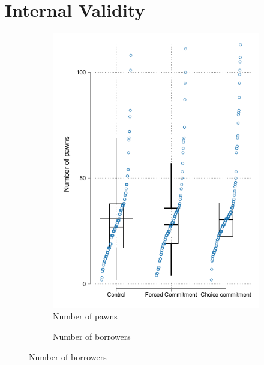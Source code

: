 \vspace{.1in}
\section{Internal Validity}

\begin{figure}[H]
     \caption{Box-plot across arms}
    \label{boxplot_attrition}
    \begin{center}
    \begin{subfigure}{0.45\textwidth}
    \caption{Number of pawns}
        \centering
        \includegraphics[width=\textwidth]{Figuras/box_plot_num_pawns.pdf}
    \end{subfigure}
        \begin{subfigure}{0.45\textwidth}
    \caption{Number of borrowers}
        \centering

\end{subfigure}
\end{center}
\end{figure}
